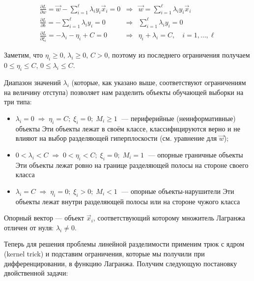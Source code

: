 $$\begin{array}{lcl}
\frac{\partial L}{\partial w} = \vec{w} - \sum\limits_{i=1}^\ell \lambda_i y_i \vec{x}_i = 0 & \Rightarrow & \vec{w} = \sum\limits_{i=1}^\ell \lambda_i y_i \vec{x}_i \\
\frac{\partial L}{\partial b} = -\sum\limits_{i=1}^\ell \lambda_i y_i = 0 & \Rightarrow & \sum\limits_{i=1}^\ell \lambda_i y_i = 0 \\
\frac{\partial L}{\partial \xi_i} = -\lambda_i - \eta_i + C = 0 & \Rightarrow & \eta_i + \lambda_i = C, \quad i = 1, \ldots, \ell
\end{array}$$

\bigskip
Заметим, что $\eta_i \geq 0$, $\lambda_i \geq 0$, $C > 0$, поэтому из последнего ограничения получаем $0 \leq \eta_i \leq C$, $0 \leq \lambda_i \leq C$.

\bigskip
Диапазон значений $\lambda_i$ (которые, как указано выше, соответствуют ограничениям на величину отступа) позволяет нам разделить объекты обучающей выборки на три типа:

\bigskip
\begin{itemize}
 \item $\lambda_i = 0 \; \Rightarrow \; \eta_i = C; \; \xi_i = 0; \; M_i \geq 1 \;$ — периферийные (неинформативные) объекты Эти объекты лежат в своём классе, классифицируются верно и не влияют на выбор разделяющей гиперплоскости (см. уравнение для $\vec{w}$);

 \item $0 < \lambda_i < C \; \Rightarrow \; 0 < \eta_i < C; \; \xi_i = 0; \; M_i = 1 \;$ — опорные граничные объекты Эти объекты лежат ровно на границе разделяющей полосы на стороне своего класса

 \item $\lambda_i = C \; \Rightarrow \; \eta_i = 0; \; \xi_i > 0; \; M_i < 1 \;$ — опорные объекты-нарушители Эти объекты лежат внутри разделяющей полосы или на стороне чужого класса
\end{itemize}

\begin{definition}
 Опорный вектор — объект $\vec{x}_i$, соответствующий которому множитель Лагранжа отличен от нуля: $\lambda_i \neq 0$.
\end{definition}

\bigskip
Теперь для решения проблемы линейной разделимости применим трюк с ядром (kernel trick) и подставим ограничения, которые мы получили при дифференцировании, в функцию Лагранжа. Получим следующую постановку двойственной задачи:

